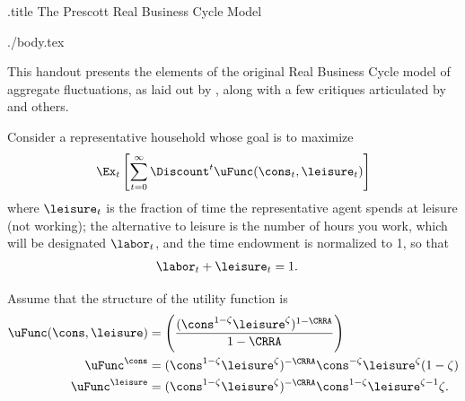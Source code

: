 \documentclass{handout}
\begin{document}
\handoutHeader

\begin{verbatimwrite}{\jobname.title}
The Prescott Real Business Cycle Model
\end{verbatimwrite}

\handoutNameMake

\begin{verbatimwrite}{./body.tex}

This handout presents the elements of the original
Real Business Cycle model of aggregate fluctuations, as laid out
by \cite{prescottTheoryAhead}, along with a few critiques articulated by \cite{summers:skeptical} and others.


Consider a representative household whose goal is to maximize
\begin{equation}
\Ex_{t} \left[\sum_{t=0}^{\infty} \Discount^{t}\uFunc(\cons_{t},\leisure_{t})      \right]
\end{equation}
where $\leisure_{t}$ is the fraction of time the representative agent spends at leisure (not working); the
alternative to leisure is the number of hours you work, which will be designated
$\labor_{t}$, and the time endowment is normalized to 1, so that
\begin{equation}\begin{gathered}\begin{aligned}
        \labor_{t}+\leisure_{t} & =  1.
\end{aligned}\end{gathered}\end{equation}

Assume that the structure of the utility function is
\begin{equation}\begin{gathered}\begin{aligned}
        \uFunc(\cons,\leisure) & =  \left(\frac{(\cons^{1-\zeta}\leisure^{\zeta})^{1-\CRRA}}{1-\CRRA}\right)
\\  \uFunc^{\cons}     & =  (\cons^{1-\zeta}\leisure^{\zeta})^{-\CRRA}\cons^{-\zeta}\leisure^{\zeta}(1-\zeta)
\\  \uFunc^{\leisure }  & =  (\cons^{1-\zeta}\leisure^{\zeta})^{-\CRRA}\cons^{1-\zeta}\leisure^{\zeta-1}\zeta.
\end{aligned}\end{gathered}\end{equation}


\end{verbatimwrite}
\end{document}
